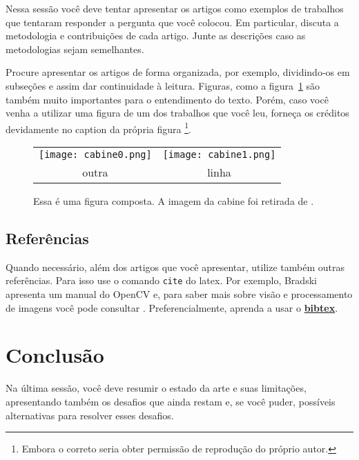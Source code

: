 \documentclass[12pt,A4]{article}
\begin{document}
Nessa sessão você deve tentar apresentar os artigos como exemplos de
trabalhos que tentaram responder a pergunta que você colocou. Em particular, discuta a metodologia e contribuições de cada artigo. Junte as descrições caso as metodologias sejam semelhantes. 

Procure apresentar os artigos de forma organizada, por exemplo,
dividindo-os em subseções e assim dar continuidade à leitura. 
Figuras, como a figura~\ref{fig:Cabines}
são também muito importantes para o 
entendimento do texto. Porém, caso você venha a utilizar uma figura de
um dos trabalhos que você leu, forneça os créditos devidamente no
caption da própria figura \footnote{Embora o correto seria obter permissão de
reprodução do próprio autor.}.

\begin{figure} 
    \begin{center}
        \begin{tabular}{cc}
    \texttt{[image: cabine0.png]} & 
    \texttt{[image: cabine1.png]} \\
    outra & linha 
    \end{tabular}
    \caption{Essa é uma figura composta. A imagem da cabine foi retirada de \cite{hartley:04}. }
\end{center}
\label{fig:Cabines}
\end{figure} 

\subsection{Referências}
\label{sec:Referencias}
Quando necessário, além dos artigos que você apresentar, utilize também
outras referências. Para isso use o comando \texttt{cite} do
latex. Por exemplo, Bradski \cite{bradski:opencv} apresenta um manual do OpenCV e, para saber mais sobre visão e processamento de imagens você pode consultar \cite{hartley:04,gon:dip}. Preferencialmente, aprenda a usar o \href{https://en.wikibooks.org/wiki/LaTeX/Bibliography_Management}{\textbf{bibtex}}.


\section{Conclusão}
\label{sec:Discussao}
Na última sessão, você deve resumir o estado da arte e suas limitações, 
apresentando também os desafios que ainda restam e, se você puder, possíveis alternativas para resolver esses desafios.
\end{document}
